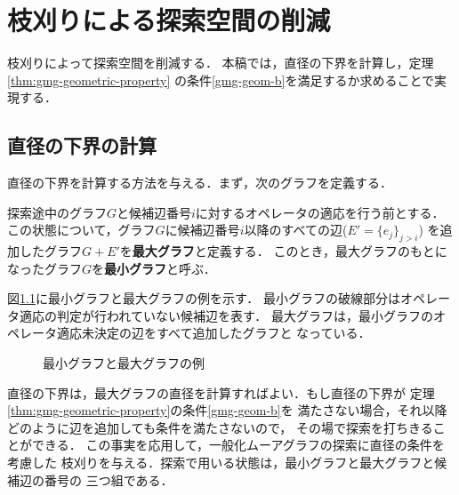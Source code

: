 
\chapter{枝刈りによる探索空間の削減}
\label{chap:reduce-by-prune}
枝刈りによって探索空間を削減する．
本稿では，直径の下界を計算し，定理\ref{thm:gmg-geometric-property}
の条件\ref{gmg-geom-b}を満足するか求めることで実現する．

\section{直径の下界の計算}
\label{sect:diameter-lower-bound}
直径の下界を計算する方法を与える．まず，次のグラフを定義する．
\begin{definition}
  探索途中のグラフ$G$と候補辺番号$i$に対するオペレータの適応を行う前とする．
  この状態について，グラフ$G$に候補辺番号$i$以降のすべての辺($E'=\{e_j\}_{j>i}$)
  を追加したグラフ$G+E'$を\textbf{最大グラフ}と定義する．
  このとき，最大グラフのもとになったグラフ$G$を\textbf{最小グラフ}と呼ぶ．
\end{definition}
\begin{example}
  図\ref{fig:min-max-graph}に最小グラフと最大グラフの例を示す．
  最小グラフの破線部分はオペレータ適応の判定が行われていない候補辺を表す．
  最大グラフは，最小グラフのオペレータ適応未決定の辺をすべて追加したグラフと
  なっている．
\end{example}
\begin{figure}
  \centering
  \hfill
  \caption{最小グラフと最大グラフの例}
  \label{fig:min-max-graph}
\end{figure}
直径の下界は，最大グラフの直径を計算すればよい．もし直径の下界が
定理\ref{thm:gmg-geometric-property}の条件\ref{gmg-geom-b}を
満たさない場合，それ以降どのように辺を追加しても条件を満たさないので，
その場で探索を打ちきることができる．
この事実を応用して，一般化ムーアグラフの探索に直径の条件を考慮した
枝刈りを与える．探索で用いる状態は，最小グラフと最大グラフと候補辺の番号の
三つ組である．

